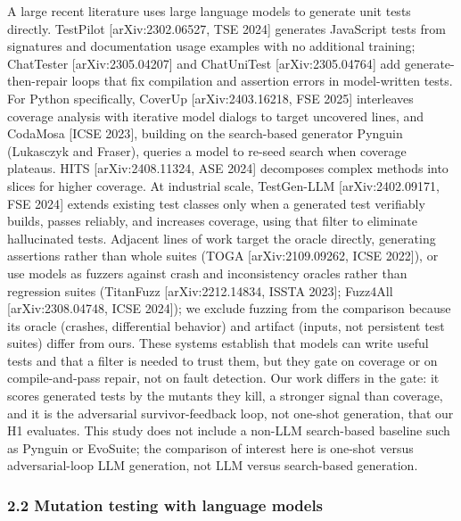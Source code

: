 \documentclass[
  11pt,
]{article}
\begin{document}
A large recent literature uses large language models to generate unit
tests directly. TestPilot {[}arXiv:2302.06527, TSE 2024{]} generates
JavaScript tests from signatures and documentation usage examples with
no additional training; ChatTester {[}arXiv:2305.04207{]} and
ChatUniTest {[}arXiv:2305.04764{]} add generate-then-repair loops that
fix compilation and assertion errors in model-written tests. For Python
specifically, CoverUp {[}arXiv:2403.16218, FSE 2025{]} interleaves
coverage analysis with iterative model dialogs to target uncovered
lines, and CodaMosa {[}ICSE 2023{]}, building on the search-based
generator Pynguin (Lukasczyk and Fraser), queries a model to re-seed
search when coverage plateaus. HITS {[}arXiv:2408.11324, ASE 2024{]}
decomposes complex methods into slices for higher coverage. At
industrial scale, TestGen-LLM {[}arXiv:2402.09171, FSE 2024{]} extends
existing test classes only when a generated test verifiably builds,
passes reliably, and increases coverage, using that filter to eliminate
hallucinated tests. Adjacent lines of work target the oracle directly,
generating assertions rather than whole suites (TOGA
{[}arXiv:2109.09262, ICSE 2022{]}), or use models as fuzzers against
crash and inconsistency oracles rather than regression suites (TitanFuzz
{[}arXiv:2212.14834, ISSTA 2023{]}; Fuzz4All {[}arXiv:2308.04748, ICSE
2024{]}); we exclude fuzzing from the comparison because its oracle
(crashes, differential behavior) and artifact (inputs, not persistent
test suites) differ from ours. These systems establish that models can
write useful tests and that a filter is needed to trust them, but they
gate on coverage or on compile-and-pass repair, not on fault detection.
Our work differs in the gate: it scores generated tests by the mutants
they kill, a stronger signal than coverage, and it is the adversarial
survivor-feedback loop, not one-shot generation, that our H1 evaluates.
This study does not include a non-LLM search-based baseline such as
Pynguin or EvoSuite; the comparison of interest here is one-shot versus
adversarial-loop LLM generation, not LLM versus search-based generation.

\subsubsection{2.2 Mutation testing with language
models}\label{mutation-testing-with-language-models}
\end{document}
